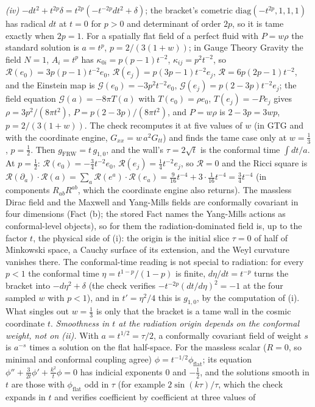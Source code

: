 \emph{(iv)} $-dt^{2} + t^{2p}\delta = t^{2p}(-t^{-2p}dt^{2} + \delta)$; the bracket's cometric $\mathrm{diag}(-t^{2p}, 1, 1, 1)$ has radical $dt$ at $t = 0$ for $p > 0$ and determinant of order $2p$, so it is tame exactly when $2p = 1$. For a spatially flat field of a perfect fluid with $P = w\rho$ the standard solution is $a = t^{p}$, $p = 2/(3(1 + w))$; in Gauge Theory Gravity the field $N = 1$, $A_{i} = t^{p}$ has $\kappa_{0i} = p(p - 1)t^{-2}$, $\kappa_{ij} = p^{2}t^{-2}$, so $\mathcal{R}(e_{0}) = 3p(p - 1)t^{-2}e_{0}$, $\mathcal{R}(e_{j}) = p(3p - 1)t^{-2}e_{j}$, $\mathcal{R} = 6p(2p - 1)t^{-2}$, and the Einstein map is $\mathcal{G}(e_{0}) = -3p^{2}t^{-2}e_{0}$, $\mathcal{G}(e_{j}) = p(2 - 3p)t^{-2}e_{j}$; the field equation $\mathcal{G}(a) = -8\pi T(a)$ with $T(e_{0}) = \rho e_{0}$, $T(e_{j}) = -Pe_{j}$ gives $\rho = 3p^{2}/(8\pi t^{2})$, $P = p(2 - 3p)/(8\pi t^{2})$, and $P = w\rho$ is $2 - 3p = 3wp$, $p = 2/(3(1 + w))$. The check recomputes it at five values of $w$ (in GTG and with the coordinate engine, $G_{xx} = w\,a^{2}G_{tt}$) and finds the tame case only at $w = \tfrac13$, $p = \tfrac12$. Then $g_{\mathrm{FRW}} = t\,g_{1,0}$, and the wall's $\tau = 2\sqrt{t}$ is the conformal time $\int dt/a$. At $p = \tfrac12$: $\mathcal{R}(e_{0}) = -\tfrac34 t^{-2}e_{0}$, $\mathcal{R}(e_{j}) = \tfrac14 t^{-2}e_{j}$, so $\mathcal{R} = 0$ and the Ricci square is $\mathcal{R}(\partial_{a})\cdot\mathcal{R}(a) = \sum_{a}\mathcal{R}(e^{a})\cdot\mathcal{R}(e_{a}) = \tfrac{9}{16}t^{-4} + 3\cdot\tfrac{1}{16}t^{-4} = \tfrac34 t^{-4}$ (in components $R_{ab}R^{ab}$, which the coordinate engine also returns). The massless Dirac field and the Maxwell and Yang-Mills fields are conformally covariant in four dimensions (Fact (b); the stored Fact  names the Yang-Mills actions as conformal-level objects), so for them the radiation-dominated field is, up to the factor $t$, the physical side of (i): the origin is the initial slice $\tau = 0$ of half of Minkowski space, a Cauchy surface of its extension, and the Weyl curvature vanishes there. The conformal-time reading is not special to radiation: for every $p < 1$ the conformal time $\eta = t^{1 - p}/(1 - p)$ is finite, $d\eta/dt = t^{-p}$ turns the bracket into $-d\eta^{2} + \delta$ (the check verifies $-t^{-2p}(dt/d\eta)^{2} = -1$ at the four sampled $w$ with $p < 1$), and in $t' = \eta^{2}/4$ this is $g_{1,0}$, by the computation of (i). What singles out $w = \tfrac13$ is only that the bracket is a tame wall in the cosmic coordinate $t$. \emph{Smoothness in $t$ at the radiation origin depends on the conformal weight, not on (ii).} With $a = t^{1/2} = \tau/2$, a conformally covariant field of weight $s$ is $a^{-s}$ times a solution on the flat half-space. For the massless scalar ($R = 0$, so minimal and conformal coupling agree) $\phi = t^{-1/2}\phi_{\mathrm{flat}}$; its equation $\phi'' + \tfrac{3}{2t}\phi' + \tfrac{k^{2}}{t}\phi = 0$ has indicial exponents $0$ and $-\tfrac12$, and the solutions smooth in $t$ are those with $\phi_{\mathrm{flat}}$ odd in $\tau$ (for example $2\sin(k\tau)/\tau$, which the check expands in $t$ and verifies coefficient by coefficient at three values of 